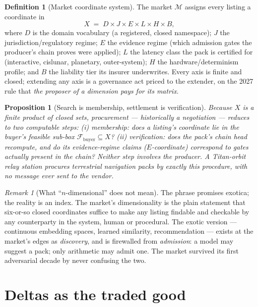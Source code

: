 \documentclass[11pt,a4paper]{report}
\newtheorem{proposition}[theorem]{Proposition}
\theoremstyle{definition}
\newtheorem{definition}[theorem]{Definition}
\theoremstyle{remark}
\newtheorem{remark}[theorem]{Remark}
\newcommand{\Mkt}{\mathcal{M}}
\newcommand{\Feas}{\mathcal{F}}
\begin{document}
\begin{definition}[Market coordinate system]\label{def:market}
The market $\Mkt$ assigns every listing a coordinate in
\[
  X \;=\; D \times J \times E \times L \times H \times B ,
\]
where $D$ is the domain vocabulary (a registered, closed namespace);
$J$ the jurisdiction/regulatory regime; $E$ the evidence regime (which
admission gates the producer's chain proves were applied); $L$ the latency
class the pack is certified for (interactive, cislunar, planetary,
outer-system); $H$ the hardware/determinism profile; and $B$ the liability
tier its insurer underwrites. Every axis is finite and closed; extending
any axis is a governance act priced to the extender, on the 2027 rule that
\emph{the proposer of a dimension pays for its matrix}.
\end{definition}

\begin{proposition}[Search is membership, settlement is verification]
Because $X$ is a finite product of closed sets, procurement --- historically
a negotiation --- reduces to two computable steps: (i) membership: does a
listing's coordinate lie in the buyer's feasible sub-box
$\Feas_{\mathrm{buyer}} \subseteq X$? (ii) verification: does the pack's
chain head recompute, and do its evidence-regime claims ($E$-coordinate)
correspond to gates actually present in the chain? Neither step involves
the producer. A Titan-orbit relay station procures terrestrial navigation
packs by exactly this procedure, with no message ever sent to the vendor.
\end{proposition}

\begin{remark}[What ``$n$-dimensional'' does not mean]
The phrase promises exotica; the reality is an index. The market's
dimensionality is the plain statement that six-or-so closed coordinates
suffice to make any listing findable and checkable by any counterparty in
the system, human or procedural. The exotic version --- continuous embedding
spaces, learned similarity, recommendation --- exists at the market's edges
as \emph{discovery}, and is firewalled from \emph{admission}: a model may
suggest a pack; only arithmetic may admit one. The market survived its
first adversarial decade by never confusing the two.
\end{remark}

\section{Deltas as the traded good}
\end{document}
